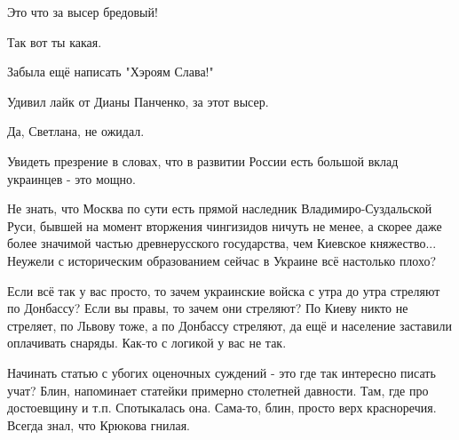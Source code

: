 \begin{itemize}
 
Это что за высер бредовый!

Так вот ты какая.

Забыла ещё написать "Хэроям Слава!"🤮

Удивил лайк от Дианы Панченко, за этот высер.


 

Да, Светлана, не ожидал.

Увидеть презрение в словах, что в развитии России есть большой вклад украинцев
- это мощно.

Не знать, что Москва по сути есть прямой наследник Владимиро-Суздальской Руси,
бывшей на момент вторжения чингизидов ничуть не менее, а скорее даже более
значимой частью древнерусского государства, чем Киевское княжество... Неужели с
историческим образованием сейчас в Украине всё настолько плохо?


 

Если всё так у вас просто, то зачем украинские войска с утра до утра стреляют
по Донбассу? Если вы правы, то зачем они стреляют? По Киеву никто не стреляет,
по Львову тоже, а по Донбассу стреляют, да ещё и население заставили оплачивать
снаряды. Как-то с логикой у вас не так.

 
Начинать статью с убогих оценочных суждений - это где так интересно писать
учат? Блин, напоминает статейки примерно столетней давности. Там, где про
достоевщину и т.п. Спотыкалась она. Сама-то, блин, просто верх красноречия.
Всегда знал, что Крюкова гнилая.


\end{itemize}
